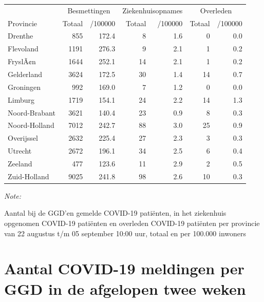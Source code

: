 \documentclass[
  english,
  man,floatsintext]{apa6}
\begin{document}
\begin{table}
\centering
\begin{threeparttable}
\begin{tabular}{lrrrrrr}
\toprule
\multicolumn{1}{c}{ } & \multicolumn{2}{c}{Besmettingen} & \multicolumn{2}{c}{Ziekenhuisopnames} & \multicolumn{2}{c}{Overleden} \\
\cmidrule(l{3pt}r{3pt}){2-3} \cmidrule(l{3pt}r{3pt}){4-5} \cmidrule(l{3pt}r{3pt}){6-7}
Provincie & Totaal & /100000 & Totaal & /100000 & Totaal & /100000\\
\midrule
Drenthe & 855 & 172.4 & 8 & 1.6 & 0 & 0.0\\
Flevoland & 1191 & 276.3 & 9 & 2.1 & 1 & 0.2\\
FryslÃ¢n & 1644 & 252.1 & 14 & 2.1 & 1 & 0.2\\
Gelderland & 3624 & 172.5 & 30 & 1.4 & 14 & 0.7\\
Groningen & 992 & 169.0 & 7 & 1.2 & 0 & 0.0\\
Limburg & 1719 & 154.1 & 24 & 2.2 & 14 & 1.3\\
Noord-Brabant & 3621 & 140.4 & 23 & 0.9 & 8 & 0.3\\
Noord-Holland & 7012 & 242.7 & 88 & 3.0 & 25 & 0.9\\
Overijssel & 2632 & 225.4 & 27 & 2.3 & 3 & 0.3\\
Utrecht & 2672 & 196.1 & 34 & 2.5 & 6 & 0.4\\
Zeeland & 477 & 123.6 & 11 & 2.9 & 2 & 0.5\\
Zuid-Holland & 9025 & 241.8 & 98 & 2.6 & 10 & 0.3\\
\bottomrule
\end{tabular}
\begin{tablenotes}
\item \textit{Note: } 
\item Aantal bij de GGD’en gemelde COVID-19 patiënten, in het ziekenhuis opgenomen COVID-19 patiënten en overleden COVID-19 patiënten per provincie van 22 augustus t/m 05 september 10:00 uur, totaal en per 100.000 inwoners
\end{tablenotes}
\end{threeparttable}
\end{table}

\newpage

\hypertarget{aantal-covid-19-meldingen-per-ggd-in-de-afgelopen-twee-weken}{%
\section{Aantal COVID-19 meldingen per GGD in de afgelopen twee weken}\label{aantal-covid-19-meldingen-per-ggd-in-de-afgelopen-twee-weken}}
\end{document}
